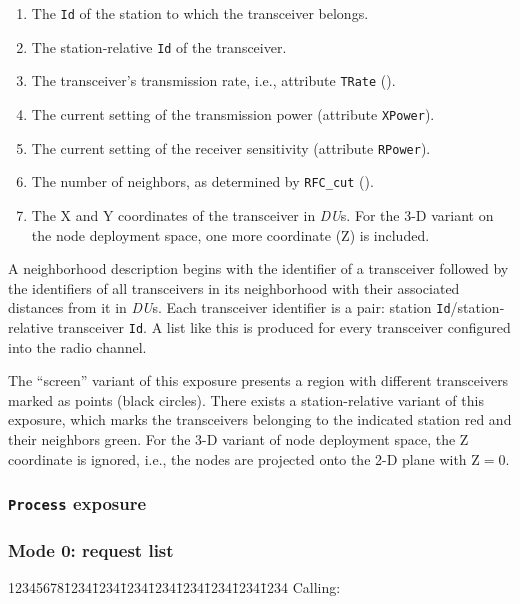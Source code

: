 \begin{enumerate}
\item
The {\tt Id} of the station to which the transceiver belongs.
\item
The station-relative {\tt Id} of the transceiver.
\item
The transceiver's transmission rate, i.e., attribute {\tt TRate}
().
\item
The current setting of the transmission power (attribute {\tt XPower}).
\item
The current setting of the receiver sensitivity (attribute {\tt RPower}).
\item
The number of neighbors, as determined by {\tt RFC\_cut} ().
\item
The X and Y coordinates of the transceiver in {\em DU\/}s.
For the 3-D variant on the node deployment space, one more coordinate (Z)
is included.
\end{enumerate}

A neighborhood description begins with the identifier of a transceiver
followed by
the identifiers of all transceivers in its neighborhood with their
associated distances from it in {\em DU\/}s.
Each transceiver identifier is a pair: station {\tt Id}/station-relative
transceiver {\tt Id}.
A list like this is produced for every
transceiver configured into the radio channel.

The ``screen'' variant of this exposure presents a region with different
transceivers marked as points (black circles).
There exists a station-relative variant of this exposure, which marks the
transceivers belonging to the indicated station red and their neighbors
green.
For the 3-D variant of node deployment space, the Z coordinate is ignored,
i.e., the nodes are projected onto the 2-D plane with Z$=0$.

\subsubsection{{\tt Process} exposure}
\label{rm_ex_se_pr}

\subsubsection*{Mode 0: request list}

{\tt\begin{tabbing}
12345678\=1234\=1234\=1234\=1234\=1234\=1234\=1234\=1234\kill
{\rm Calling:}
\end{tabbing}}

